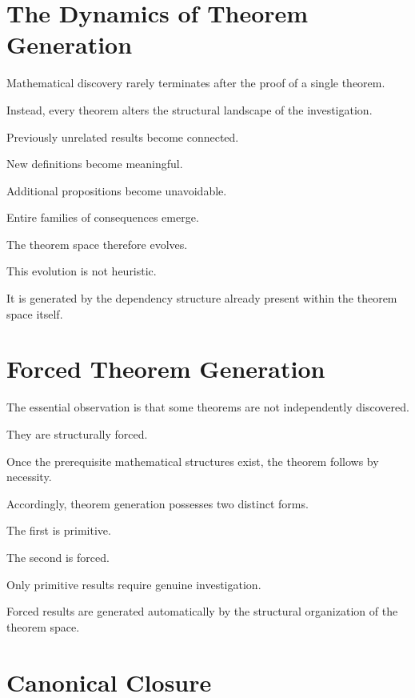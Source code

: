 \documentclass[13pt,openany]{book}
\theoremstyle{plain}
\theoremstyle{definition}
\begin{document}
\section{The Dynamics of Theorem Generation}

Mathematical discovery rarely terminates after the proof of a single theorem.

Instead, every theorem alters the structural landscape of the investigation.

Previously unrelated results become connected.

New definitions become meaningful.

Additional propositions become unavoidable.

Entire families of consequences emerge.

The theorem space therefore evolves.

This evolution is not heuristic.

It is generated by the dependency structure already present within the theorem
space itself.

\section{Forced Theorem Generation}

The essential observation is that some theorems are not independently
discovered.

They are structurally forced.

Once the prerequisite mathematical structures exist, the theorem follows by
necessity.

Accordingly, theorem generation possesses two distinct forms.

The first is primitive.

The second is forced.

Only primitive results require genuine investigation.

Forced results are generated automatically by the structural organization of
the theorem space.

\section{Canonical Closure}
\end{document}
